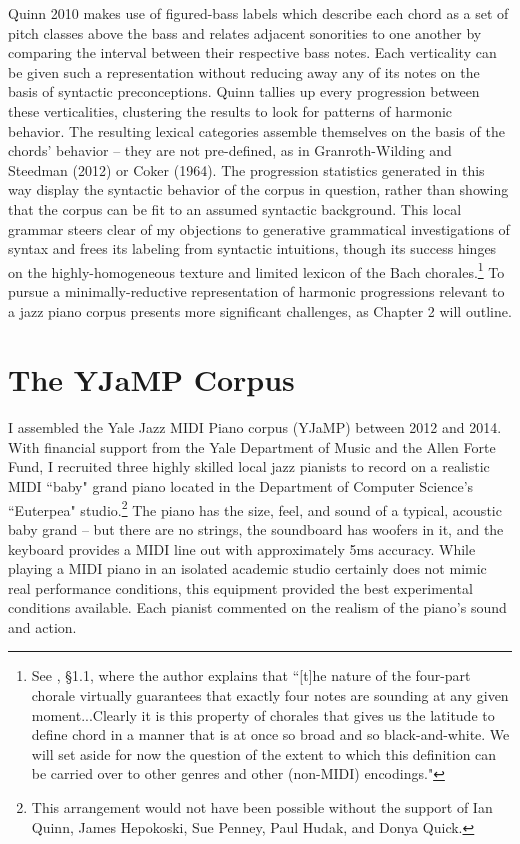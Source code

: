 Quinn 2010 makes use of figured-bass labels which describe each chord as a set of pitch classes above the bass and relates adjacent sonorities to one another by comparing the interval between their respective bass notes.  Each verticality can be given such a representation without reducing away any of its notes on the basis of syntactic preconceptions.  Quinn tallies up every progression between these verticalities, clustering the results to look for patterns of harmonic behavior.  The resulting lexical categories assemble themselves on the basis of the chords' behavior -- they are not pre-defined, as in Granroth-Wilding and Steedman (2012) or Coker (1964).  The progression statistics generated in this way display the syntactic behavior of the corpus in question, rather than showing that the corpus can be fit to an assumed syntactic background.  This local grammar steers clear of my objections to generative grammatical investigations of syntax and frees its labeling from syntactic intuitions, though its success hinges on the highly-homogeneous texture and limited lexicon of the Bach chorales.\footnote{See \cite{quinn2010}, \S 1.1, where the author explains that ``[t]he nature of the four-part chorale virtually guarantees that exactly four notes are sounding at any given moment...Clearly it is this property of chorales that gives us the latitude to define chord in a manner that is at once so broad and so black-and-white. We will set aside for now the question of the extent to which this definition can be carried over to other genres and other (non-MIDI) encodings."}  To pursue a minimally-reductive representation of harmonic progressions relevant to a jazz piano corpus presents more significant challenges, as Chapter 2 will outline.

\section{The YJaMP Corpus}

I assembled the Yale Jazz MIDI Piano corpus (YJaMP) between 2012 and 2014.  With financial support from the Yale Department of Music and the Allen Forte Fund, I recruited three highly skilled local jazz pianists to record on a realistic MIDI ``baby" grand piano located in the Department of Computer Science's ``Euterpea" studio.\footnote{This arrangement would not have been possible without the support of Ian Quinn, James Hepokoski, Sue Penney, Paul Hudak, and Donya Quick.}  The piano has the size, feel, and sound of a typical, acoustic baby grand -- but there are no strings, the soundboard has woofers in it, and the keyboard provides a MIDI line out with approximately 5ms accuracy.  While playing a MIDI piano in an isolated academic studio certainly does not mimic real performance conditions, this equipment provided the best experimental conditions available.  Each pianist commented on the realism of the piano's sound and action.

